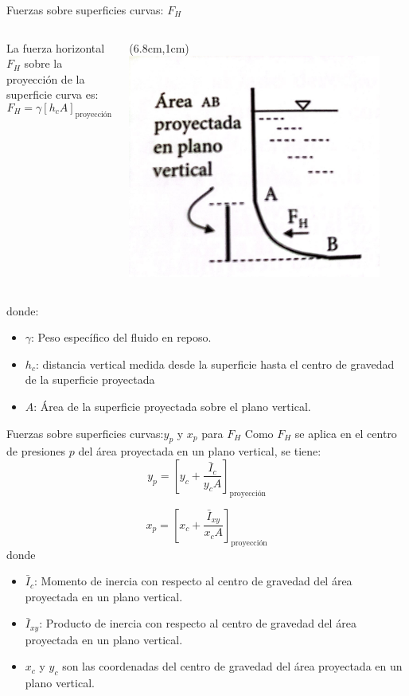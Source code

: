 \documentclass [xcolor=svgnames, t] {beamer}
\begin{document}
\begin{frame}{Fuerzas sobre superficies curvas: $F_H$}
\begin{columns}
La fuerza horizontal $F_H$ sobre la proyecci\'on de la superficie curva es:
$$
F_H=\gamma[h_c A]_{\text{proyecci\'on}} 
$$
\begin{textblock*}{6cm}(6.8cm,1cm) %
\includegraphics[width=0.9\textwidth]{curb3}
\end{textblock*}
\end{columns}
\vspace{1.5cm}
donde:
\begin{itemize} 
\item $\gamma$: Peso espec\'ifico del fluido en reposo.
\item $h_c$: distancia vertical medida desde la superficie hasta el centro de gravedad de la superficie proyectada
\item $A$: \'Area de la superficie proyectada sobre el plano vertical.
\end{itemize}
\end{frame}

\begin{frame}{Fuerzas sobre superficies curvas:$y_p$ y $x_p$ para $F_H$}
Como $F_H$ se aplica en el centro de presiones $p$ del \'area proyectada en un plano vertical, se tiene:
$$
y_p = \left[ y_c + \frac{\bar{I}_c}{y_c A} \right]_{\text{proyecci\'on}}
$$

$$
x_p = \left[ x_c + \frac{\bar{I}_{xy}}{x_c A} \right]_{\text{proyecci\'on}}
$$
donde
\begin{itemize}
\item $\bar{I}_c$: Momento de inercia con respecto al centro de gravedad del \'area proyectada en un plano vertical.
\item $\bar{I}_{xy}$: Producto de inercia con respecto al centro de gravedad del \'area proyectada en un plano vertical.
\item $x_c$ y $y_c$ son las coordenadas del centro de gravedad del \'area proyectada en un plano vertical.
\end{itemize}
\end{frame}
\end{document}
